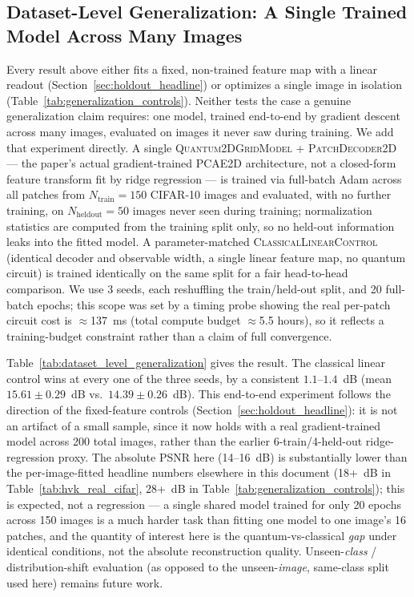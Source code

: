 \documentclass[11pt]{article}
\begin{document}
\subsection{Dataset-Level Generalization: A Single Trained Model Across Many Images}
\label{sec:dataset_level_generalization}
Every result above either fits a fixed, non-trained feature map with a linear readout (Section~\ref{sec:holdout_headline}) or optimizes a single image in isolation (Table~\ref{tab:generalization_controls}). Neither tests the case a genuine generalization claim requires: one model, trained end-to-end by gradient descent across many images, evaluated on images it never saw during training. We add that experiment directly. A single \textsc{Quantum2DGridModel} + \textsc{PatchDecoder2D} --- the paper's actual gradient-trained PCAE2D architecture, not a closed-form feature transform fit by ridge regression --- is trained via full-batch Adam across all patches from $N_{\text{train}}=150$ CIFAR-10 images and evaluated, with no further training, on $N_{\text{heldout}}=50$ images never seen during training; normalization statistics are computed from the training split only, so no held-out information leaks into the fitted model. A parameter-matched \textsc{ClassicalLinearControl} (identical decoder and observable width, a single linear feature map, no quantum circuit) is trained identically on the same split for a fair head-to-head comparison. We use 3 seeds, each reshuffling the train/held-out split, and 20 full-batch epochs; this scope was set by a timing probe showing the real per-patch circuit cost is $\approx$137~ms (total compute budget $\approx$5.5 hours), so it reflects a training-budget constraint rather than a claim of full convergence.

Table~\ref{tab:dataset_level_generalization} gives the result. The classical linear control wins at every one of the three seeds, by a consistent $1.1$--$1.4$~dB (mean $15.61\pm0.29$~dB vs.\ $14.39\pm0.26$~dB). This end-to-end experiment follows the direction of the fixed-feature controls (Section~\ref{sec:holdout_headline}): it is not an artifact of a small sample, since it now holds with a real gradient-trained model across 200 total images, rather than the earlier 6-train/4-held-out ridge-regression proxy. The absolute PSNR here (14--16~dB) is substantially lower than the per-image-fitted headline numbers elsewhere in this document (18+~dB in Table~\ref{tab:hvk_real_cifar}, 28+~dB in Table~\ref{tab:generalization_controls}); this is expected, not a regression --- a single shared model trained for only 20 epochs across 150 images is a much harder task than fitting one model to one image's 16 patches, and the quantity of interest here is the quantum-vs-classical \emph{gap} under identical conditions, not the absolute reconstruction quality. Unseen-\emph{class} / distribution-shift evaluation (as opposed to the unseen-\emph{image}, same-class split used here) remains future work.
\end{document}
